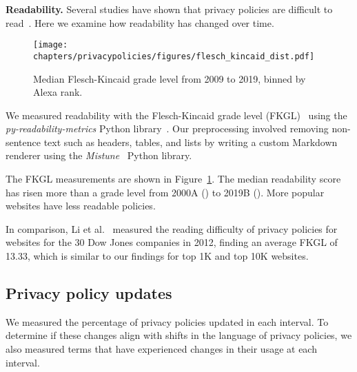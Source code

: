 {\bf Readability.}
\label{sec:ppot:readability}
Several studies have shown that privacy policies are difficult to read~\cite{mcdonald2008cost,fabian2017large,milne2006longitudinal,li2012online}. 
Here we examine how readability has changed over time.
\begin{figure}
\centering
\texttt{[image: chapters/privacypolicies/figures/flesch\_kincaid\_dist.pdf]}
\caption{Median Flesch-Kincaid grade level from 2009 to 2019, binned by Alexa rank. 
}
\label{fig:readability}
\end{figure}
We measured readability with the Flesch-Kincaid grade level (FKGL)~\cite{kincaid1975derivation}
using the \textit{py-readability-metrics} Python library~\cite{pyreadabilitymetrics}.
Our preprocessing involved removing non-sentence text such as headers, tables, and lists by writing a custom Markdown renderer using the \emph{Mistune}~\cite{mistune} Python library.

The FKGL measurements are shown in Figure~\ref{fig:readability}. The median readability score has risen more than a grade level from 2000A (\medianFKStart) to 2019B (\medianFKEnd). More popular websites have less readable policies.

In comparison, Li et al.~\cite{li2012online} measured the reading difficulty of privacy policies for websites for the 30 Dow Jones companies in 2012, finding an average FKGL of 13.33, which is similar to our findings for top 1K and top 10K websites.





\subsection{Privacy policy updates}
We measured the percentage of privacy policies updated in each interval.
To determine if these changes align with shifts in the language of privacy policies, we also measured terms that have experienced changes in their usage at each interval.

